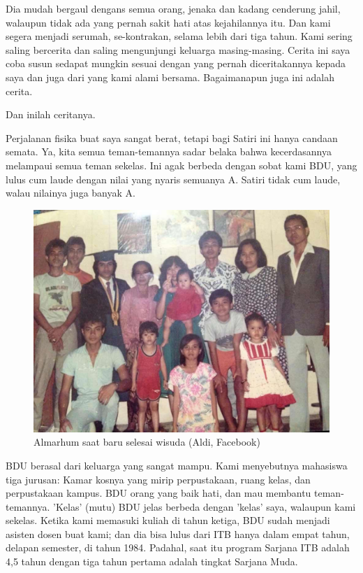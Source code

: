 Dia mudah bergaul dengans semua orang, jenaka dan kadang cenderung jahil, walaupun tidak ada yang pernah sakit hati atas kejahilannya itu. Dan kami segera menjadi serumah, se-kontrakan, selama lebih dari tiga tahun. Kami sering saling bercerita dan saling mengunjungi keluarga masing-masing. Cerita ini saya coba susun sedapat mungkin sesuai dengan yang pernah diceritakannya kepada saya dan juga dari yang kami alami bersama. Bagaimanapun juga ini adalah cerita.

Dan inilah ceritanya.

Perjalanan fisika buat saya sangat berat, tetapi bagi Satiri ini hanya candaan semata. Ya, kita semua teman-temannya sadar belaka bahwa kecerdasannya melampaui semua teman sekelas. Ini agak berbeda dengan sobat kami BDU, yang lulus cum laude dengan nilai yang nyaris semuanya A. Satiri tidak cum laude, walau nilainya juga banyak A.

\begin{figure}[htbp]
\centerline{\includegraphics[scale=0.9]{01-01-02}}
\caption{Almarhum saat baru selesai wisuda (Aldi, Facebook)}
\label{01-01-02}
\end{figure}
%

BDU berasal dari keluarga yang sangat mampu. Kami menyebutnya mahasiswa tiga jurusan: Kamar kosnya yang mirip perpustakaan, ruang kelas, dan perpustakaan kampus. BDU orang yang baik hati, dan mau membantu teman-temannya. 'Kelas' (mutu) BDU jelas berbeda dengan 'kelas' saya, walaupun kami sekelas. Ketika kami memasuki kuliah di tahun ketiga, BDU sudah menjadi asisten dosen buat kami; dan dia bisa lulus dari ITB hanya dalam empat tahun, delapan semester, di tahun 1984. Padahal, saat itu program Sarjana ITB adalah 4,5 tahun dengan tiga tahun pertama adalah tingkat Sarjana Muda.

